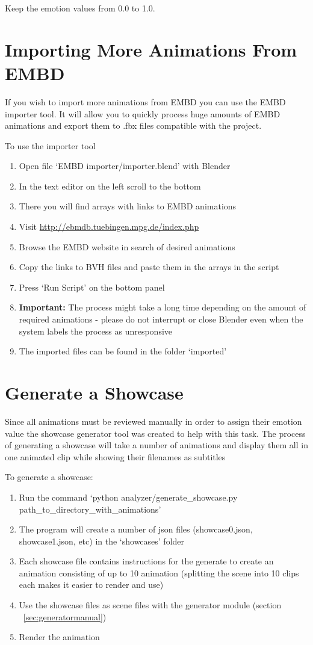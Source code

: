 \noindent Keep the emotion values from 0.0 to 1.0.


\section{Importing More Animations From EMBD}
If you wish to import more animations from EMBD you can use the EMBD importer tool. It will allow you to quickly process huge amounts of EMBD animations and export them to .fbx files compatible with the project.

\noindent To use the importer tool
\begin{enumerate}
	\item Open file `EMBD importer/importer.blend' with Blender
	\item In the text editor on the left scroll to the bottom
	\item There you will find arrays with links to EMBD animations
	\item Visit \url{http://ebmdb.tuebingen.mpg.de/index.php}
	\item Browse the EMBD website in search of desired animations
	\item Copy the links to BVH files and paste them in the arrays in the script
	\item Press `Run Script' on the bottom panel
	\item \textbf{Important:} The process might take a long time depending on the amount of required animations - please do not interrupt or close Blender even when the system labels the process as unresponsive
	\item The imported files can be found in the folder `imported'
\end{enumerate}


\section{Generate a Showcase \label{sec:showcasegeneratormanual}}
Since all animations must be reviewed manually in order to assign their emotion value the showcase generator tool was created to help with this task. The process of generating a showcase will take a number of animations and display them all in one animated clip while showing their filenames as subtitles

\noindent To generate a showcase:
\begin{enumerate}
	\item Run the command `python analyzer/generate\_showcase.py path\_to\_directory\_with\_animations'
	\item The program will create a number of json files (showcase0.json, showcase1.json, etc) in the `showcases' folder
	\item Each showcase file contains instructions for the generate to create an animation consisting of up to 10 animation (splitting the scene into 10 clips each makes it easier to render and use)
	\item Use the showcase files as scene files with the generator module (section ~\ref{sec:generatormanual})
	\item Render the animation
\end{enumerate}



